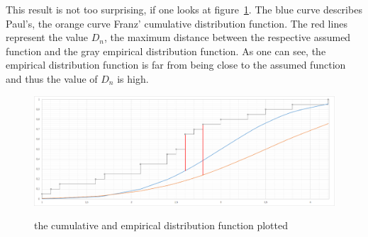 \documentclass{article}
\begin{document}
This result is not too surprising, if one looks at figure~\ref{fig:1}. The blue curve describes Paul's, the orange curve Franz' cumulative distribution function. The red lines represent the value $D_n$, the maximum distance between the respective assumed function and the gray empirical distribution function.
As one can see, the empirical distribution function is far from being close to the assumed function and thus the value of $D_n$ is high.
\begin{figure}[here]
\caption{the cumulative and empirical distribution function plotted}
\center
\includegraphics[width=1.0\textwidth]{figures/diagramKSexample.png}
\label{fig:1}
\end{figure}
\end{document}
